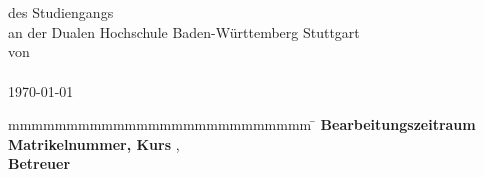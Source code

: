 
\begin{titlepage}
	\enlargethispage{20mm}
	\begin{center}
		\vspace*{12mm}	{\LARGE\textbf \titel}\\
		\vspace*{12mm}	{\large\textbf \art}\\
		\vspace*{12mm}	{des Studiengangs \studienbereich}\\
		\vspace*{3mm}	{an der Dualen Hochschule Baden-Württemberg Stuttgart}\\
		\vspace*{12mm}	{von}\\
		\vspace*{3mm}		{\large\textbf \autor}\\
		\vspace*{12mm}	\today\\
	\end{center}
	\vfill
	\begin{spacing}{1.2}
	\begin{tabbing}
		mmmmmmmmmmmmmmmmmmmmmmmmmm		\= \kill
		\textbf{Bearbeitungszeitraum}	\>  \bearbeitungszeitraum\\
		\textbf{Matrikelnummer, Kurs}	\>  \matrikelnr, \kurs\\
		\textbf{Betreuer}				\>  \betreuer\\
	\end{tabbing}
	\end{spacing}
\end{titlepage}